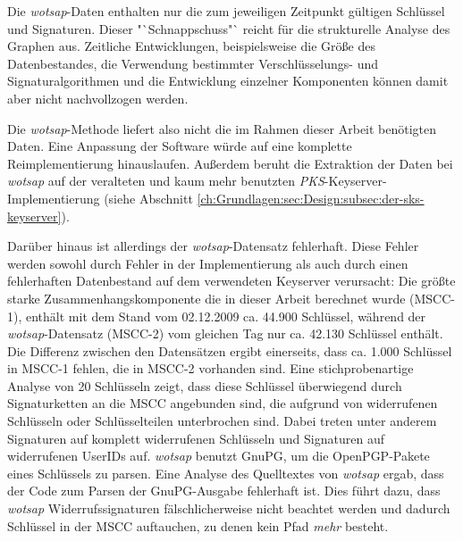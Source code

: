 Die \emph{wotsap}-Daten enthalten nur die zum jeweiligen Zeitpunkt
gültigen Schlüssel und Signaturen. Dieser "`Schnappschuss"` reicht für
die strukturelle Analyse des Graphen aus. Zeitliche Entwicklungen,
beispielsweise die Größe des Datenbestandes, die Verwendung
bestimmter Verschlüsselungs- und Signaturalgorithmen und die Entwicklung
einzelner Komponenten können damit aber nicht nachvollzogen werden.

Die \emph{wotsap}-Methode liefert also nicht die im Rahmen dieser
Arbeit benötigten Daten. Eine Anpassung der Software würde auf eine
komplette Reimplementierung hinauslaufen. Außerdem beruht die
Extraktion der Daten bei \emph{wotsap} auf der veralteten und kaum
mehr benutzten \emph{PKS}-Keyserver-Implementierung (siehe Abschnitt
\ref{ch:Grundlagen:sec:Design:subsec:der-sks-keyserver}).

Darüber hinaus ist allerdings der \emph{wotsap}-Datensatz
fehlerhaft. Diese Fehler werden sowohl durch Fehler in der
Implementierung als auch durch einen fehlerhaften Datenbestand auf dem
verwendeten Keyserver verursacht: Die größte starke
Zusammenhangskomponente die in dieser Arbeit berechnet wurde (MSCC-1),
enthält mit dem Stand vom 02.12.2009 ca. 44.900 Schlüssel, während der
\emph{wotsap}-Datensatz (MSCC-2) vom gleichen Tag nur ca. 42.130
Schlüssel enthält. Die Differenz zwischen den Datensätzen ergibt
einerseits, dass ca. 1.000 Schlüssel in MSCC-1 fehlen, die in MSCC-2
vorhanden sind. Eine stichprobenartige Analyse von 20 Schlüsseln
zeigt, dass diese Schlüssel überwiegend durch Signaturketten an die
MSCC angebunden sind, die aufgrund von widerrufenen Schlüsseln oder
Schlüsselteilen unterbrochen sind. Dabei treten unter anderem
Signaturen auf komplett widerrufenen Schlüsseln und Signaturen auf
widerrufenen UserIDs auf. \emph{wotsap} benutzt GnuPG, um die
OpenPGP-Pakete eines Schlüssels zu parsen. Eine Analyse des
Quelltextes von \emph{wotsap} ergab, dass der Code zum Parsen der
GnuPG-Ausgabe fehlerhaft ist. Dies führt dazu, dass \emph{wotsap}
Widerrufssignaturen fälschlicherweise nicht beachtet werden und
dadurch Schl\"ussel in der MSCC auftauchen, zu denen kein Pfad
\emph{mehr} besteht.

